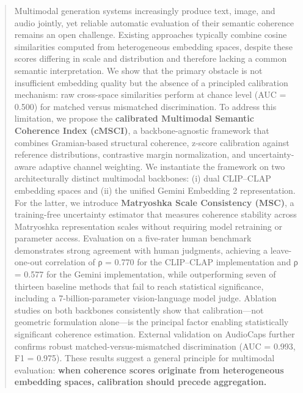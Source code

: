 \documentclass[a4paper,fleqn]{cas-sc}
\begin{document}
\begin{abstract}
Multimodal generation systems increasingly produce text, image, and audio jointly, yet reliable automatic evaluation of their semantic coherence remains an open challenge. Existing approaches typically combine cosine similarities computed from heterogeneous embedding spaces, despite these scores differing in scale and distribution and therefore lacking a common semantic interpretation. We show that the primary obstacle is not insufficient embedding quality but the absence of a principled calibration mechanism: raw cross-space similarities perform at chance level (AUC = 0.500) for matched versus mismatched discrimination. To address this limitation, we propose the \textbf{calibrated Multimodal Semantic Coherence Index (cMSCI)}, a backbone-agnostic framework that combines Gramian-based structural coherence, z-score calibration against reference distributions, contrastive margin normalization, and uncertainty-aware adaptive channel weighting. We instantiate the framework on two architecturally distinct multimodal backbones: (i) dual CLIP–CLAP embedding spaces and (ii) the unified Gemini Embedding 2 representation. For the latter, we introduce \textbf{Matryoshka Scale Consistency (MSC)}, a training-free uncertainty estimator that measures coherence stability across Matryoshka representation scales without requiring model retraining or parameter access. Evaluation on a five-rater human benchmark demonstrates strong agreement with human judgments, achieving a leave-one-out correlation of ρ = 0.770 for the CLIP–CLAP implementation and ρ = 0.577 for the Gemini implementation, while outperforming seven of thirteen baseline methods that fail to reach statistical significance, including a 7-billion-parameter vision-language model judge. Ablation studies on both backbones consistently show that calibration—not geometric formulation alone—is the principal factor enabling statistically significant coherence estimation. External validation on AudioCaps further confirms robust matched-versus-mismatched discrimination (AUC = 0.993, F1 = 0.975). These results suggest a general principle for multimodal evaluation: \textbf{when coherence scores originate from heterogeneous embedding spaces, calibration should precede aggregation.}
\end{abstract}

\end{document}
